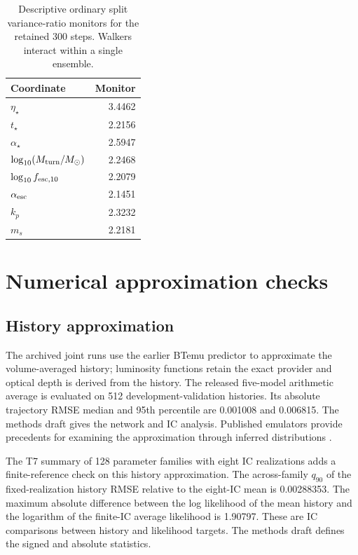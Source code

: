\begin{table}[b]\centering\small
\caption{Descriptive ordinary split variance-ratio monitors for the retained 300 steps. Walkers interact within a single ensemble.}\label{tab:current-sampling-monitors}
\begin{tabular}{lr}\toprule
Coordinate & Monitor\\\midrule
$\eta_\star$ & 3.4462\\
$t_\star$ & 2.2156\\
$\alpha_\star$ & 2.5947\\
$\log_{10}(M_{\rm turn}/M_\odot)$ & 2.2468\\
$\log_{10}f_{{\rm esc},10}$ & 2.2079\\
$\alpha_{\rm esc}$ & 2.1451\\
$k_p$ & 2.3232\\
$m_s$ & 2.2181\\\bottomrule
\end{tabular}\end{table}

\section{Numerical approximation checks}\label{app:approximation}

\subsection{History approximation}\label{reported-history-accuracy}

The archived joint runs use the earlier BTemu predictor to approximate the volume-averaged history; luminosity functions retain the exact provider and optical depth is derived from the history. The released five-model arithmetic average is evaluated on 512 development-validation histories. Its absolute trajectory RMSE median and 95th percentile are 0.001008 and 0.006815. The methods draft gives the network and IC analysis. Published emulators provide precedents for examining the approximation through inferred distributions \cite{Breitman2024,Breitman2026}.

The T7 summary of 128 parameter families with eight IC realizations adds a finite-reference check on this history approximation. The across-family $q_{90}$ of the fixed-realization history RMSE relative to the eight-IC mean is 0.00288353. The maximum absolute difference between the log likelihood of the mean history and the logarithm of the finite-IC average likelihood is 1.90797. These are IC comparisons between history and likelihood targets. The methods draft defines the signed and absolute statistics.

